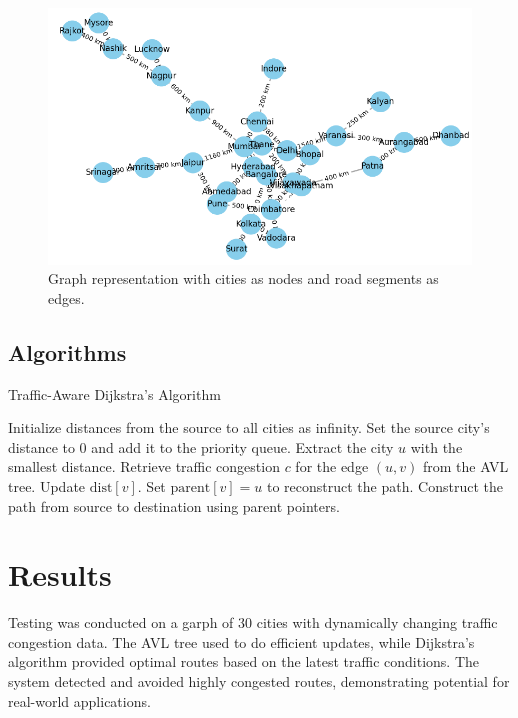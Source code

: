 \documentclass{article}
\begin{document}
\begin{figure}[H]
\centering
\includegraphics[scale=0.75]{road_network.png}
 \caption{Graph representation with cities as nodes and road segments as edges.}
\end{figure}

\subsection{Algorithms}
\begin{algorithm}
\caption{Traffic-Aware Dijkstra’s Algorithm}
\begin{algorithmic}[1]
    \State Initialize distances from the source to all cities as infinity.
    \State Set the source city's distance to 0 and add it to the priority queue.
        \State Extract the city \( u \) with the smallest distance.
            \State Retrieve traffic congestion \( c \) for the edge \( (u, v) \) from the AVL tree.
                \State Update \( \text{dist}[v] \).
                \State Set \( \text{parent}[v] = u \) to reconstruct the path.
            \EndIf
        \EndFor
    \EndWhile
    \State Construct the path from source to destination using parent pointers.
\end{algorithmic}
\end{algorithm}

\section{Results}
Testing was conducted on a garph of 30 cities with dynamically changing traffic congestion data. The AVL tree used to do  efficient updates, while Dijkstra's algorithm provided optimal routes based on the latest traffic conditions. The system detected and avoided highly congested routes, demonstrating potential for real-world applications.
\end{document}
